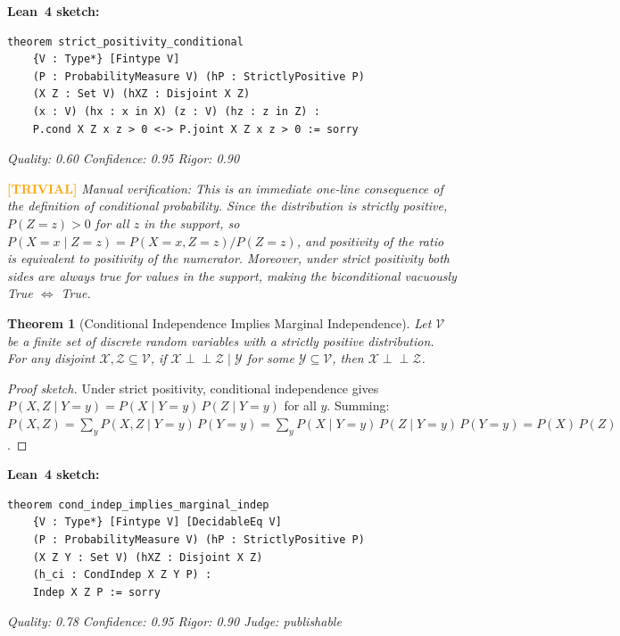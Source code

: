 \documentclass[11pt,a4paper]{article}
\newtheorem{theorem}{Theorem}
\begin{document}
\noindent\textbf{Lean~4 sketch:}
\begin{verbatim}
theorem strict_positivity_conditional
    {V : Type*} [Fintype V]
    (P : ProbabilityMeasure V) (hP : StrictlyPositive P)
    (X Z : Set V) (hXZ : Disjoint X Z)
    (x : V) (hx : x in X) (z : V) (hz : z in Z) :
    P.cond X Z x z > 0 <-> P.joint X Z x z > 0 := sorry
\end{verbatim}

\medskip
\noindent\emph{Quality: 0.60 \quad Confidence: 0.95 \quad Rigor: 0.90}

\noindent\textcolor{orange}{\textbf{[TRIVIAL]}} \emph{Manual verification: This is an immediate one-line consequence of the definition of conditional probability. Since the distribution is strictly positive, $P(Z{=}z) > 0$ for all $z$ in the support, so $P(X{=}x \mid Z{=}z) = P(X{=}x, Z{=}z)/P(Z{=}z)$, and positivity of the ratio is equivalent to positivity of the numerator. Moreover, under strict positivity both sides are always true for values in the support, making the biconditional vacuously True $\iff$ True.}


\begin{theorem}[Conditional Independence Implies Marginal Independence]
\label{thm:cond_indep_marginal}
Let $\mathcal{V}$ be a finite set of discrete random variables with a strictly positive distribution. For any disjoint $\mathcal{X}, \mathcal{Z} \subseteq \mathcal{V}$, if $\mathcal{X} \perp\!\!\!\perp \mathcal{Z} \mid \mathcal{Y}$ for some $\mathcal{Y} \subseteq \mathcal{V}$, then $\mathcal{X} \perp\!\!\!\perp \mathcal{Z}$.
\end{theorem}

\begin{proof}[Proof sketch]
Under strict positivity, conditional independence gives $P(X,Z \mid Y{=}y) = P(X \mid Y{=}y)\,P(Z \mid Y{=}y)$ for all $y$. Summing: $P(X,Z) = \sum_y P(X,Z \mid Y{=}y)\,P(Y{=}y) = \sum_y P(X \mid Y{=}y)\,P(Z \mid Y{=}y)\,P(Y{=}y) = P(X)\,P(Z)$.
\end{proof}

\noindent\textbf{Lean~4 sketch:}
\begin{verbatim}
theorem cond_indep_implies_marginal_indep
    {V : Type*} [Fintype V] [DecidableEq V]
    (P : ProbabilityMeasure V) (hP : StrictlyPositive P)
    (X Z Y : Set V) (hXZ : Disjoint X Z)
    (h_ci : CondIndep X Z Y P) :
    Indep X Z P := sorry
\end{verbatim}

\medskip
\noindent\emph{Quality: 0.78 \quad Confidence: 0.95 \quad Rigor: 0.90 \quad Judge: publishable}
\end{document}
